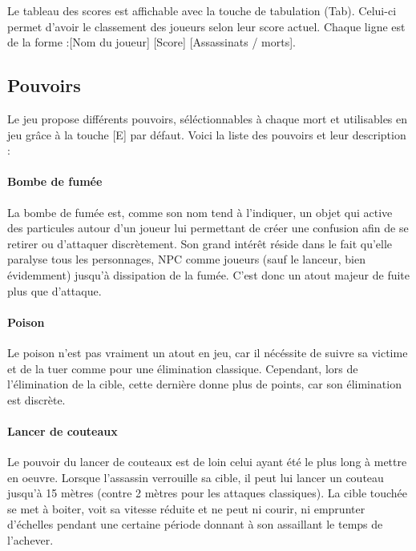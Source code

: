         Le tableau des scores est affichable avec la touche de tabulation (Tab). Celui-ci permet d’avoir le classement des joueurs selon 
        leur score actuel. Chaque ligne est de la forme :[Nom du joueur] [Score] [Assassinats / morts].

\subsection{Pouvoirs}

    Le jeu propose différents pouvoirs, séléctionnables à chaque mort et utilisables en jeu grâce à la touche [E] par défaut. 
    Voici la liste des pouvoirs et leur description :

    \paragraph{Bombe de fumée}

        La bombe de fumée est, comme son nom tend à l'indiquer, un objet qui active des particules autour d'un joueur lui 
        permettant de créer une confusion afin de se retirer ou d'attaquer discrètement. Son grand intérêt réside dans le fait 
        qu'elle paralyse tous les personnages, NPC comme joueurs (sauf le lanceur, bien évidemment) jusqu'à dissipation de la fumée. 
        C'est donc un atout majeur de fuite plus que d'attaque.

    \paragraph{Poison}

        Le poison n'est pas vraiment un atout en jeu, car il nécéssite de suivre sa victime et de la tuer comme pour une 
        élimination classique. Cependant, lors de l'élimination de la cible, cette dernière donne plus de points, car son 
        élimination est discrète.

    \paragraph{Lancer de couteaux}

        Le pouvoir du lancer de couteaux est de loin celui ayant été le plus long à mettre en oeuvre. Lorsque l'assassin 
        verrouille sa cible, il peut lui lancer un couteau jusqu'à 15 mètres (contre 2 mètres pour les attaques classiques).
        La cible touchée se met à boiter, voit sa vitesse réduite et ne peut ni courir, ni emprunter d'échelles pendant une certaine 
        période donnant à son assaillant le temps de l'achever. 

